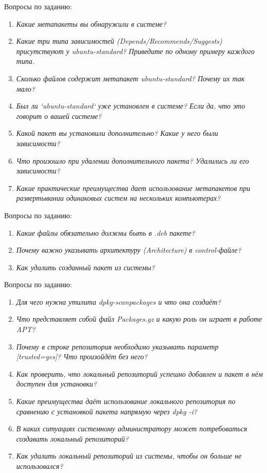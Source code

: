 Вопросы по заданию:
\begin{enumerate}
	\item \textit{Какие метапакеты вы обнаружили в системе?}
	\item \textit{Какие три типа зависимостей (Depends/Recommends/Suggests) присутствуют у ubuntu-standard? Приведите по одному примеру каждого типа.}
	\item \textit{Сколько файлов содержит метапакет ubuntu-standard? Почему их так мало?}
	\item \textit{Был ли `ubuntu-standard` уже установлен в системе? Если да, что это говорит о вашей системе?}
	\item \textit{Какой пакет вы установили дополнительно? Какие у него были зависимости?}
	\item \textit{Что произошло при удалении дополнительного пакета? Удалились ли его зависимости?}
	\item \textit{Какие практические преимущества дает использование метапакетов при развертывании одинаковых систем на нескольких компьютерах?}
\end{enumerate}


Вопросы по заданию:
\begin{enumerate}
	\item \textit{Какие файлы обязательно должны быть в .deb пакете?}
	\item \textit{Почему важно указывать архитектуру (Architecture) в control-файле?}
	\item \textit{Как удалить созданный пакет из системы?}
\end{enumerate}


Вопросы по заданию:
\begin{enumerate}
	\item \textit{Для чего нужна утилита dpkg-scanpackages и что она создаёт?}
	\item \textit{Что представляет собой файл Packages.gz и какую роль он играет в работе APT?}
	\item \textit{Почему в строке репозитория необходимо указывать параметр [trusted=yes]? Что произойдёт без него?}
	\item \textit{Как проверить, что локальный репозиторий успешно добавлен и пакет в нём доступен для установки?}
	\item \textit{Какие преимущества даёт использование локального репозитория по сравнению с установкой пакета напрямую через dpkg -i?}
	\item \textit{В каких ситуациях системному администратору может потребоваться создавать локальный репозиторий?}
	\item \textit{Как удалить локальный репозиторий из системы, чтобы он больше не использовался?}
\end{enumerate}

